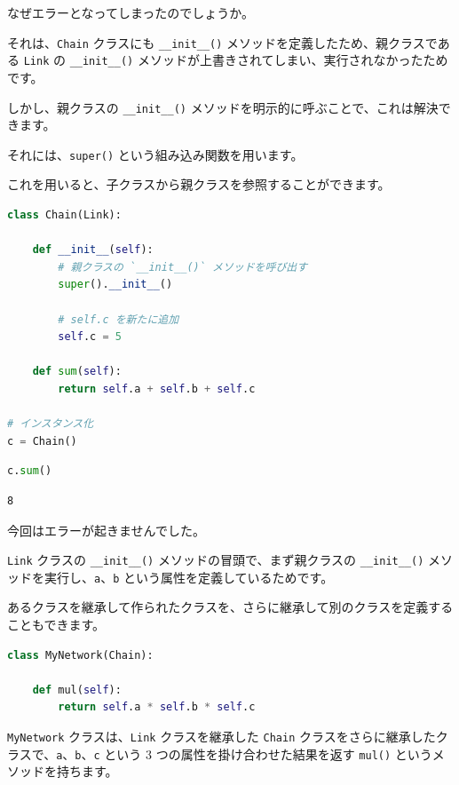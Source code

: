 なぜエラーとなってしまったのでしょうか。


それは、\texttt{Chain} クラスにも \texttt{\_\_init\_\_()} メソッドを定義したため、親クラスである \texttt{Link} の \texttt{\_\_init\_\_()}  メソッドが上書きされてしまい、実行されなかったためです。

しかし、親クラスの \texttt{\_\_init\_\_()}  メソッドを明示的に呼ぶことで、これは解決できます。


それには、\texttt{super()} という組み込み関数を用います。

これを用いると、子クラスから親クラスを参照することができます。


\begin{lstlisting}[style=codecell,language=Python]
class Chain(Link):

    def __init__(self):
        # 親クラスの `__init__()` メソッドを呼び出す
        super().__init__()
        
        # self.c を新たに追加
        self.c = 5
    
    def sum(self):
        return self.a + self.b + self.c

# インスタンス化
c = Chain()
\end{lstlisting}

\begin{lstlisting}[style=codecell,language=Python]
c.sum()
\end{lstlisting}

\begin{lstlisting}[style=outputcell]
8
\end{lstlisting}

今回はエラーが起きませんでした。

\texttt{Link} クラスの \texttt{\_\_init\_\_()}  メソッドの冒頭で、まず親クラスの \texttt{\_\_init\_\_()}  メソッドを実行し、\texttt{a}、\texttt{b} という属性を定義しているためです。


あるクラスを継承して作られたクラスを、さらに継承して別のクラスを定義することもできます。


\begin{lstlisting}[style=codecell,language=Python]
class MyNetwork(Chain):
    
    def mul(self):
        return self.a * self.b * self.c
\end{lstlisting}

\texttt{MyNetwork} クラスは、\texttt{Link} クラスを継承した \texttt{Chain} クラスをさらに継承したクラスで、\texttt{a}、\texttt{b}、\texttt{c} という 3 つの属性を掛け合わせた結果を返す \texttt{mul()} というメソッドを持ちます。


